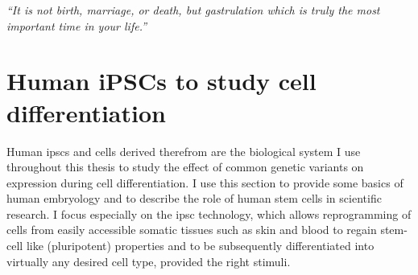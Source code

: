 



\newpage

\vspace*{10px}

\textit{“It is not birth, marriage, or death, but gastrulation which is truly the most important time in your life.”}\\

\vspace*{5px}


\section{Human iPSCs to study cell differentiation}  %
\label{sec:human_ipscs}  

Human \glspl{ipsc} and cells derived therefrom are the biological system I use throughout this thesis to study the effect of common genetic variants on expression during cell differentiation.
I use this section to provide some basics of human embryology and to describe the role of human stem cells in scientific research.
I focus especially on the \gls{ipsc} technology, which allows reprogramming of cells from easily accessible somatic tissues such as skin and blood to regain stem-cell like (pluripotent) properties and to be subsequently differentiated into virtually any desired cell type, provided the right stimuli.\\

